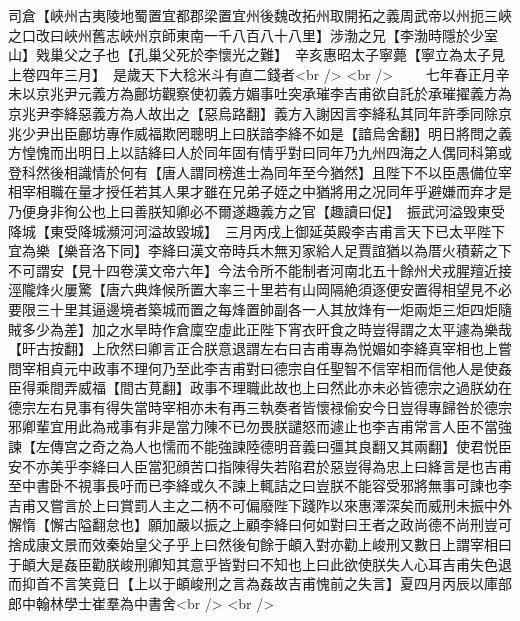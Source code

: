 司倉【峽州古夷陵地蜀置宜都郡梁置宜州後魏改拓州取開拓之義周武帝以州扼三峽之口改曰峽州舊志峽州京師東南一千八百八十八里】涉渤之兄【李渤時隱於少室山】戣巢父之子也【孔巢父死於李懷光之難】　辛亥惠昭太子寧薨【寧立為太子見上卷四年三月】　是歲天下大稔米斗有直二錢者<br />
<br />
　　七年春正月辛未以京兆尹元義方為鄜坊觀察使初義方媚事吐突承璀李吉甫欲自託於承璀擢義方為京兆尹李絳惡義方為人故出之【惡烏路翻】義方入謝因言李絳私其同年許季同除京兆少尹出臣鄜坊專作威福欺罔聰明上曰朕諳李絳不如是【諳烏舍翻】明日將問之義方惶愧而出明日上以詰絳曰人於同年固有情乎對曰同年乃九州四海之人偶同科第或登科然後相識情於何有【唐人謂同榜進士為同年至今猶然】且陛下不以臣愚備位宰相宰相職在量才授任若其人果才雖在兄弟子姪之中猶將用之况同年乎避嫌而弃才是乃便身非徇公也上曰善朕知卿必不爾遂趣義方之官【趣讀曰促】　振武河溢毁東受降城【東受降城瀕河河溢故毀城】　三月丙戌上御延英殿李吉甫言天下已太平陛下宜為樂【樂音洛下同】李絳曰漢文帝時兵木無刃家給人足賈誼猶以為厝火積薪之下不可謂安【見十四卷漢文帝六年】今法令所不能制者河南北五十餘州犬戎腥羶近接涇隴烽火屢驚【唐六典烽候所置大率三十里若有山岡隔絶須逐便安置得相望見不必要限三十里其逼邊境者築城而置之每烽置帥副各一人其放烽有一炬兩炬三炬四炬隨賊多少為差】加之水旱時作倉廩空虛此正陛下宵衣旰食之時豈得謂之太平遽為樂哉【旰古按翻】上欣然曰卿言正合朕意退謂左右曰吉甫專為悦媚如李絳真宰相也上嘗問宰相貞元中政事不理何乃至此李吉甫對曰德宗自任聖智不信宰相而信他人是使姦臣得乘間弄威福【間古莧翻】政事不理職此故也上曰然此亦未必皆德宗之過朕幼在德宗左右見事有得失當時宰相亦未有再三執奏者皆懷禄偷安今日豈得專歸咎於德宗邪卿輩宜用此為戒事有非是當力陳不已勿畏朕譴怒而遽止也李吉甫常言人臣不當強諫【左傳宫之奇之為人也懦而不能強諫陸德明音義曰彊其良翻又其兩翻】使君悦臣安不亦美乎李絳曰人臣當犯顔苦口指陳得失若陷君於惡豈得為忠上曰絳言是也吉甫至中書卧不視事長吁而已李絳或久不諫上輒詰之曰豈朕不能容受邪將無事可諫也李吉甫又嘗言於上曰賞罰人主之二柄不可偏廢陛下踐阼以來惠澤深矣而威刑未振中外懈惰【懈古隘翻怠也】願加嚴以振之上顧李絳曰何如對曰王者之政尚德不尚刑豈可捨成康文景而效秦始皇父子乎上曰然後旬餘于頔入對亦勸上峻刑又數日上謂宰相曰于頔大是姦臣勸朕峻刑卿知其意乎皆對曰不知也上曰此欲使朕失人心耳吉甫失色退而抑首不言笑竟日【上以于頔峻刑之言為姦故吉甫愧前之失言】夏四月丙辰以庫部郎中翰林學士崔羣為中書舍<br />
<br />

